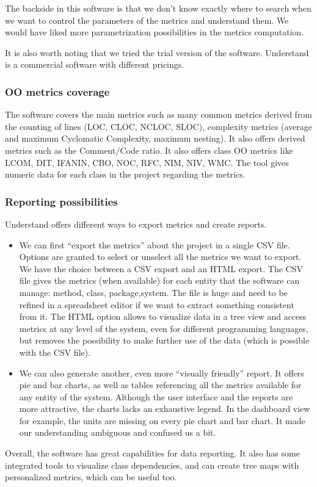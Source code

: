         The backside in this software is that we don't know exactly where to search when we want to control the parameters of the metrics and understand them. We would have liked more parametrization possibilities in the metrics computation.
        
        It is also worth noting that we tried the trial version of the software. Understand is a commercial software with different pricings.
    
    \subsubsection{OO metrics coverage}
    
        The software covers the main metrics such as many common metrics derived from the counting of lines (LOC, CLOC, NCLOC, SLOC), complexity metrics (average and maximum Cyclomatic Complexity, maximum nesting). It also offers derived metrics such as the Comment/Code ratio. It also offers class OO metrics like LCOM, DIT, IFANIN, CBO, NOC, RFC, NIM, NIV, WMC. The tool gives numeric data for each class in the project regarding the metrics.
    
    \subsubsection{Reporting possibilities}
    
        Understand offers different ways to export metrics and create reports. 
        
        \begin{itemize}
            \item We can first ``export the metrics'' about the project in a single CSV file. Options are granted to select or unselect all the metrics we want to export. We have the choice between a CSV export and an HTML export. The CSV file gives the metrics (when available) for each entity that the software can manage: method, class, package,system. The file is huge and need to be refined in a spreadsheet editor if we want to extract something consistent from it. The HTML option allows to visualize data in a tree view and access metrics at any level of the system, even for different programming languages, but removes the possibility to make further use of the data (which is possible with the CSV file).
            
            \item We can also generate another, even more ``visually friendly'' report. It offers pie and bar charts, as well as tables referencing all the metrics available for any entity of the system. Although the user interface and the reports are more attractive, the charts lacks an exhaustive legend. In the dashboard view for example, the units are missing on every pie chart and bar chart. It made our understanding ambiguous and confused us a bit.
        
        \end{itemize}
        
        Overall, the software has great capabilities for data reporting. It also has some integrated tools to visualize class dependencies, and can create tree maps with personalized metrics, which can be useful too.
    